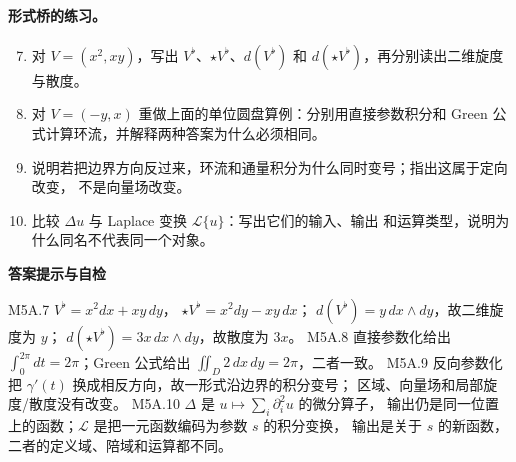 \documentclass[UTF8,fontset=none,a4paper,11pt]{ctexart}
\theoremstyle{foundation-definition}
\theoremstyle{foundation-theorem}
\theoremstyle{foundation-proposition}
\theoremstyle{foundation-example}
\theoremstyle{foundation-remark}
\theoremstyle{foundation-theorem}
\newenvironment{answerkey}{%
\begin{mdframed}[backgroundcolor=examplebg,linecolor=examplepurple,linewidth=1.0pt,
  leftline=true,rightline=false,topline=false,bottomline=false,
  skipabove=7pt,skipbelow=8pt,innerleftmargin=10pt,innerrightmargin=8pt,
  innertopmargin=6pt,innerbottommargin=6pt]
{\sffamily\bfseries\color{examplepurple}答案提示与自检}\par\smallskip\small
}{\end{mdframed}}
\begin{document}
\paragraph{形式桥的练习。}
\begin{enumerate}[label=M5A.\arabic*.]
  \setcounter{enumi}{6}
  \item 对 \(V=(x^2,xy)\)，写出 \(V^\flat\)、\(\star V^\flat\)、\(d(V^\flat)\) 和
    \(d(\star V^\flat)\)，再分别读出二维旋度与散度。
  \item 对 \(V=(-y,x)\) 重做上面的单位圆盘算例：分别用直接参数积分和
    Green 公式计算环流，并解释两种答案为什么必须相同。
  \item 说明若把边界方向反过来，环流和通量积分为什么同时变号；指出这属于定向改变，
    不是向量场改变。
  \item 比较 \(\Delta u\) 与 Laplace 变换 \(\mathcal L\{u\}\)：写出它们的输入、输出
    和运算类型，说明为什么同名不代表同一个对象。
\end{enumerate}

\begin{answerkey}
M5A.7 \(V^\flat=x^2dx+x y\,dy\)，
\(\star V^\flat=x^2dy-x y\,dx\)；
\(d(V^\flat)=y\,dx\wedge dy\)，故二维旋度为 \(y\)；
\(d(\star V^\flat)=3x\,dx\wedge dy\)，故散度为 \(3x\)。
M5A.8 直接参数化给出
\(\int_0^{2\pi}dt=2\pi\)；Green 公式给出
\(\iint_D2\,dx\,dy=2\pi\)，二者一致。
M5A.9 反向参数化把 \(\gamma'(t)\) 换成相反方向，故一形式沿边界的积分变号；
区域、向量场和局部旋度/散度没有改变。
M5A.10 \(\Delta\) 是 \(u\mapsto\sum_i\partial_i^2u\) 的微分算子，
输出仍是同一位置上的函数；\(\mathcal L\) 是把一元函数编码为参数 \(s\) 的积分变换，
输出是关于 \(s\) 的新函数，二者的定义域、陪域和运算都不同。
\end{answerkey}
\end{document}
